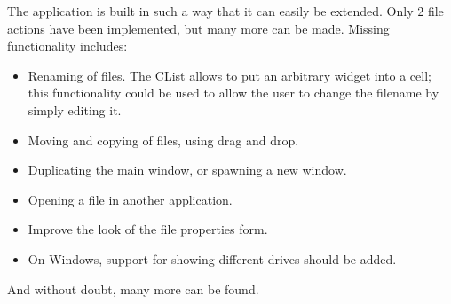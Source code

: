 \documentclass[10pt]{article}
\begin{document}
The application is built in such a way that it can easily be extended. 
Only 2 file actions have been implemented, but many more can be made.
Missing functionality includes:
\begin{itemize}
\item Renaming of files. The CList allows to put an arbitrary widget into
a cell; this functionality could be used to allow the user to change the
filename by simply editing it.
\item Moving and copying of files, using drag and drop.
\item Duplicating the main window, or spawning a new window.
\item Opening a file in another application.
\item Improve the look of the file properties form.
\item On Windows, support for showing different drives should be added.
\end{itemize}
And without doubt, many more can be found.
\end{document}

